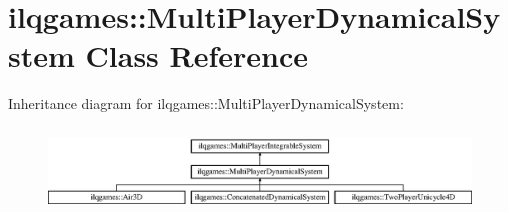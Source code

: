 \hypertarget{classilqgames_1_1_multi_player_dynamical_system}{}\section{ilqgames\+:\+:Multi\+Player\+Dynamical\+System Class Reference}
\label{classilqgames_1_1_multi_player_dynamical_system}
Inheritance diagram for ilqgames\+:\+:Multi\+Player\+Dynamical\+System\+:\begin{figure}[H]
\begin{center}
\leavevmode
\includegraphics[height=2.231076cm]{classilqgames_1_1_multi_player_dynamical_system}
\end{center}
\end{figure}
